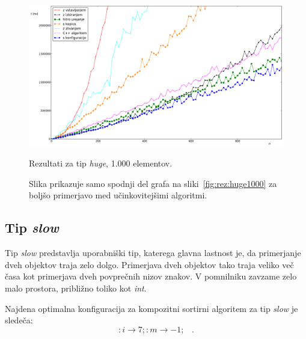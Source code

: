 \documentclass[a4paper,oneside,12pt]{article}
\newcommand{\lra}{\ensuremath{\longrightarrow}}
\newcommand{\edot}{\;\;\;.}
\begin{document}
\begin{figure}[h!]
    \includegraphics[width=\textwidth]{slike/huge1000zoom.pdf}
    \vspace{-0.7cm}
    \caption[Rezultati za tip \emph{huge}, 1.000 el. -- izrez]{Rezultati za tip
    \emph{huge}, 1.000 elementov.}
    \caption*{{\small Slika
    prikazuje samo spodnji del grafa na sliki~\ref{fig:rez:huge1000} za
    boljšo primerjavo med učinkovitejšimi algoritmi.}}
    \label{fig:rez:hugeblizu}
\end{figure}

\pagebreak
\mbox{}

\pagebreak

\subsection{Tip \emph{slow}}
\label{chapter:rez:slow}
Tip \emph{slow} predstavlja uporabniški tip, katerega glavna lastnost je, da primerjanje dveh objektov
traja zelo dolgo. Primerjava dveh objektov tako traja veliko več časa kot primerjava dveh povprečnih
nizov znakov. V pomnilniku zavzame zelo malo prostora, približno toliko kot \emph{int}.

Najdena optimalna konfiguracija za kompozitni sortirni algoritem za tip \emph{slow} je sledeča:
\[ :i \lra 7;:m \lra -1; \edot \]
\end{document}
